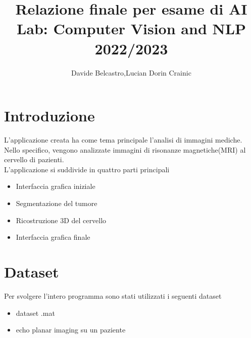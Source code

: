 \documentclass{article}
\title{Relazione finale per esame di AI Lab: Computer Vision and NLP 2022/2023}
\author{Davide Belcastro,Lucian Dorin Crainic}
\date{}
\begin{document}
\maketitle



\section{Introduzione}
L'applicazione creata ha come tema principale l'analisi di immagini mediche.\\
Nello specifico, vengono analizzate immagini di risonanze magnetiche(MRI) al cervello di pazienti.\\
L'applicazione si suddivide in quattro parti principali
\begin{itemize}
    \item Interfaccia grafica iniziale
    \item Segmentazione del tumore
    \item Ricostruzione 3D del cervello
    \item Interfaccia grafica finale
\end{itemize}


\section{Dataset}
Per svolgere l'intero programma sono stati utilizzati i seguenti dataset
\begin{itemize}
    \item dataset .mat
    \item echo planar imaging su un paziente
\end{itemize}
\end{document}
